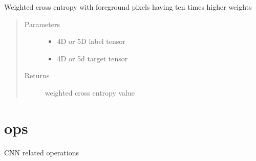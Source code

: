 \documentclass[letterpaper,10pt,english]{sphinxmanual}
\begin{document}
\begin{fulllineitems}
\label{\detokenize{index:unet.loss.weighted_cross_entropy}}
Weighted cross entropy with foreground pixels having ten times higher weights
\begin{quote}\begin{description}
\item[{Parameters}] \leavevmode\begin{itemize}
\item {} 
 \textendash{} 4D or 5D label tensor

\item {} 
 \textendash{} 4D or 5d target tensor

\end{itemize}

\item[{Returns}] \leavevmode
weighted cross entropy value

\end{description}\end{quote}

\end{fulllineitems}



\section{ops}
\label{\detokenize{index:module-unet.ops}}\label{\detokenize{index:ops}}
CNN related operations
\end{document}
